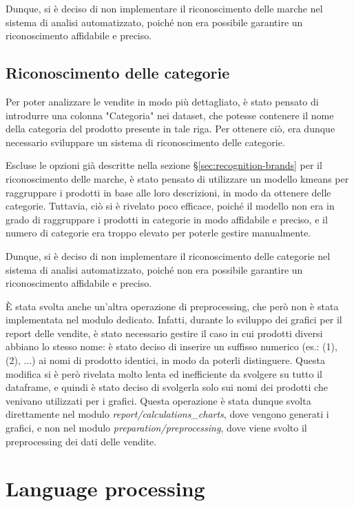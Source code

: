 Dunque, si è deciso di non implementare il riconoscimento delle marche nel sistema di analisi automatizzato, poiché non era possibile garantire un riconoscimento affidabile e preciso.


\subsection{Riconoscimento delle categorie}
\label{sec:recognition-categories}

Per poter analizzare le vendite in modo più dettagliato, è stato pensato di introdurre una colonna "Categoria" nei dataset, che potesse contenere il nome della categoria del prodotto presente in tale riga. Per ottenere ciò, era dunque necessario sviluppare un sistema di riconoscimento delle categorie.

Escluse le opzioni già descritte nella sezione \S\ref{sec:recognition-brands} per il riconoscimento delle marche, è stato pensato di utilizzare un modello \gls{kmeans}\glsfirstoccur{} per raggruppare i prodotti in base alle loro descrizioni, in modo da ottenere delle categorie. Tuttavia, ciò si è rivelato poco efficace, poiché il modello non era in grado di raggruppare i prodotti in categorie in modo affidabile e preciso, e il numero di categorie era troppo elevato per poterle gestire manualmente.

Dunque, si è deciso di non implementare il riconoscimento delle categorie nel sistema di analisi automatizzato, poiché non era possibile garantire un riconoscimento affidabile e preciso.


È stata svolta anche un'altra operazione di preprocessing, che però non è stata implementata nel modulo dedicato.
Infatti, durante lo sviluppo dei grafici per il report delle vendite, è stato necessario gestire il caso in cui prodotti diversi abbiano lo stesso nome: è stato deciso di inserire un suffisso numerico (es.: (1), (2), ...) ai nomi di prodotto identici, in modo da poterli distinguere. Questa modifica si è però rivelata molto lenta ed inefficiente da svolgere su tutto il dataframe, e quindi è stato deciso di svolgerla solo sui nomi dei prodotti che venivano utilizzati per i grafici.
Questa operazione è stata dunque svolta direttamente nel modulo \emph{report/calculations\_charts}, dove vengono generati i grafici, e non nel modulo \emph{preparation/preprocessing}, dove viene svolto il preprocessing dei dati delle vendite.



\section{Language processing}
\label{sec:language-processing}

